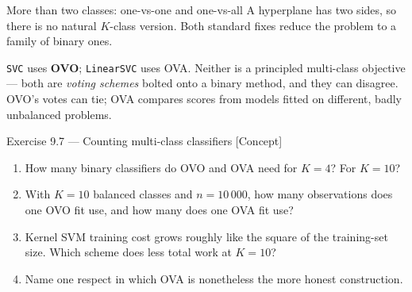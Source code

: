\documentclass[aspectratio=169,11pt]{beamer}
\begin{document}
\begin{frame}{More than two classes: one-vs-one and one-vs-all}
  \footnotesize
  A hyperplane has two sides, so there is no natural $K$-class version. Both
  standard fixes reduce the problem to a family of binary ones.
  \begin{center}
  \end{center}
  \begin{takeaway}
    \texttt{SVC} uses \textbf{OVO}; \texttt{LinearSVC} uses OVA. Neither is a
    principled multi-class objective --- both are \emph{voting schemes} bolted
    onto a binary method, and they can disagree. OVO's votes can tie; OVA
    compares scores from models fitted on different, badly unbalanced problems.
  \end{takeaway}
\end{frame}

\begin{frame}{Exercise 9.7 --- Counting multi-class classifiers [Concept]}
\begin{exercise}
  \begin{enumerate}
    \item How many binary classifiers do OVO and OVA need for $K=4$? For
          $K=10$?
    \item With $K=10$ balanced classes and $n=10\,000$, how many observations
          does one OVO fit use, and how many does one OVA fit use?
    \item Kernel SVM training cost grows roughly like the square of the
          training-set size. Which scheme does less total work at $K=10$?
    \item Name one respect in which OVA is nonetheless the more honest
          construction.
  \end{enumerate}
\end{exercise}
\end{frame}
\end{document}
